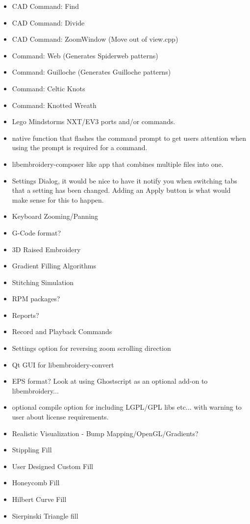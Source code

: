 \documentclass[10pt]{report}
\begin{document}
\begin{itemize}
  \item CAD Command: Find
  \item CAD Command: Divide
  \item CAD Command: ZoomWindow (Move out of view.cpp)
  \item Command: Web (Generates Spiderweb patterns)
  \item Command: Guilloche (Generates Guilloche patterns)
  \item Command: Celtic Knots
  \item Command: Knotted Wreath
  \item Lego Mindstorms NXT/EV3 ports and/or commands.
  \item native function that flashes the command prompt to get users attention when using the prompt is required for a command.
  \item libembroidery-composer like app that combines multiple files into one.
  \item Settings Dialog, it would be nice to have it notify you when switching tabs that a setting has been changed. Adding an Apply button is what would make sense for this to happen.
  \item Keyboard Zooming/Panning
  \item G-Code format?
  \item 3D Raised Embroidery
  \item Gradient Filling Algorithms
  \item Stitching Simulation
  \item RPM packages?
  \item Reports?
  \item Record and Playback Commands
  \item Settings option for reversing zoom scrolling direction
  \item Qt GUI for libembroidery-convert
  \item EPS format? Look at using Ghostscript as an optional add-on to libembroidery...
  \item optional compile option for including LGPL/GPL libs etc... with warning to user about license requirements.
  \item Realistic Visualization - Bump Mapping/OpenGL/Gradients?
  \item Stippling Fill
  \item User Designed Custom Fill
  \item Honeycomb Fill
  \item Hilbert Curve Fill
  \item Sierpinski Triangle fill

\end{itemize}
\end{document}
